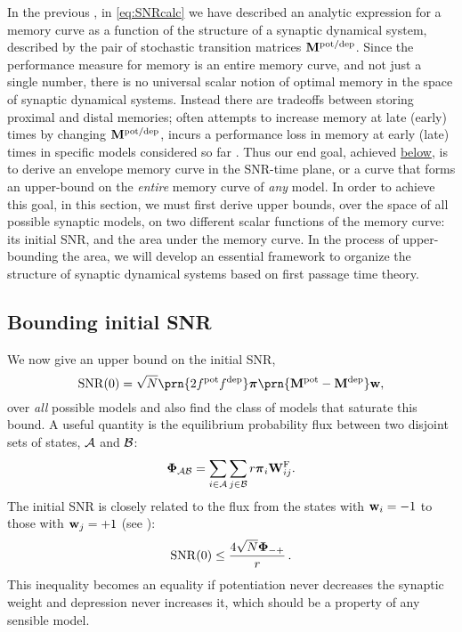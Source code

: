 In the previous , in \cref{eq:SNRcalc} we have described an analytic expression for a memory curve as a function of the structure of a synaptic dynamical system, described by the pair of stochastic transition matrices  $\mathbf{M}^{\text{pot/dep}}$.
Since the performance measure for memory is an entire memory curve, and not just a single number, there is no universal scalar notion of optimal memory in the space of synaptic dynamical systems.
Instead there are tradeoffs between storing proximal and distal memories;  often attempts to increase memory at late (early) times by changing $\mathbf{M}^{\text{pot/dep}}$, incurs a performance loss in memory at early (late) times in specific models considered so far \cite{Fusi2005cascade,Fusi2007multistate,Leibold2008serial}.
Thus our end goal, achieved \hyperref[eq:env]{below}, is to derive an envelope memory curve in the SNR-time plane, or a curve that forms an upper-bound on the {\it entire} memory curve of {\it any} model.
In order to achieve this goal, in this section, we must first derive upper bounds, over the space of all possible synaptic models, on two different scalar functions of the memory curve: its initial SNR, and the area under the memory curve.
In the process of upper-bounding the area, we will develop an essential framework to organize the structure of synaptic dynamical systems based on first passage time theory.


\subsection{Bounding initial SNR}\label{sec:initial}

We now give an upper bound on the initial SNR,
%
\begin{equation}\label{eq:init}
  \snr(0) = \sqrt{N}\prn{2 f\pot f\dep} \eq \prn{\M\pot-\M\dep} \w,
\end{equation}
%
over \emph{all} possible models and also find the class of models that saturate this bound.
A useful quantity is the equilibrium probability flux between two disjoint sets of states, $\mathcal{A}$ and $\mathcal{B}$:
%
\begin{equation}\label{eq:flux}
  \boldsymbol{\Phi}_{\mathcal{A}\mathcal{B}} = \sum_{i\in\mathcal{A}} \sum_{j\in\mathcal{B}} r \boldsymbol{\pi}_i \mathbf{W}^{\mathrm{F}}_{ij}.
\end{equation}
%
The initial SNR is closely related to the flux from the states with $\mathbf{w}_i=-1$ to those with $\mathbf{w}_j=+1$ (see \supp):
%
\begin{equation}\label{eq:initflux}
  \operatorname{SNR}(0) \leq \frac{4\sqrt{N}\boldsymbol{\Phi}_{-+}}{r}\,.
\end{equation}
%
This inequality becomes an equality if potentiation never decreases the synaptic weight and depression never increases it, which should be a property of any sensible model.

